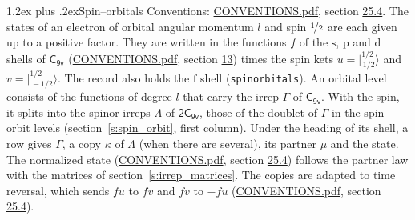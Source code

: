 \documentclass[10pt,a4paper]{article}
\makeatletter
\renewcommand\section{\@startsection{section}{1}{\z@}{-3ex plus -1ex minus -.2ex}%
  {1.2ex plus .2ex}{\normalfont\large\sffamily\bfseries\color{parttitle}}}
\numberwithin{equation}{section}
\newcommand{\grp}[1]{\mathsf{#1}}
\newcommand{\orbital}[1]{\mathrm{#1}}
\newcommand{\mult}{\kappa}
\newcommand{\intx}{\mu}
\newcommand{\jm}[2]{\bigl\lvert{}^{#1}_{\,#2}\bigr\rangle}
\makeatother
\begin{document}
\section{Spin--orbitals}\label{s:spin_orbitals}
Conventions: \href{../../CONVENTIONS.pdf}{CONVENTIONS.pdf}, section \href{../../CONVENTIONS.pdf\#conv.25.4}{25.4}.
\leavevmode\label{n:index.orbital.l}The states of an electron of orbital angular momentum $l$ and spin $\nicefrac{1}{2}$ are each given up to a positive factor. \label{n:local.spinor.uv}\label{n:local.function.f}They are written in the functions $f$ of the $\orbital{s}$, $\orbital{p}$ and $\orbital{d}$ shells of \href{../../../rotation/data/pdf/C9v.pdf}{$\grp{C_{9v}}$} (\href{../../CONVENTIONS.pdf}{CONVENTIONS.pdf}, section \href{../../../rotation/CONVENTIONS.pdf\#conv.13}{13}) times the spin kets $u = \jm{1/2}{1/2}$ and $v = \jm{1/2}{-1/2}$. The record also holds the $\orbital{f}$ shell (\texttt{spinorbitals}). An orbital level consists of the functions of degree $l$ that carry the irrep $\Gamma$ of \href{../../../rotation/data/pdf/C9v.pdf}{$\grp{C_{9v}}$}. With the spin, it splits into the spinor irreps $\Lambda$ of $\grp{2C_{9v}}$, those of the doublet of $\Gamma$ in the spin--orbit levels (section~\ref{s:spin_orbit}, first column). \label{n:head.state}Under the heading of its shell, a row gives $\Gamma$, a copy $\mult$ of $\Lambda$ (when there are several), its partner $\intx$ and the state. The normalized state (\href{../../CONVENTIONS.pdf}{CONVENTIONS.pdf}, section \href{../../CONVENTIONS.pdf\#conv.25.4}{25.4}) follows the partner law with the matrices of section~\ref{s:irrep_matrices}. The copies are adapted to time reversal, which sends $f u$ to $f v$ and $f v$ to $-f u$ (\href{../../CONVENTIONS.pdf}{CONVENTIONS.pdf}, section \href{../../CONVENTIONS.pdf\#conv.25.4}{25.4}).
\end{document}
